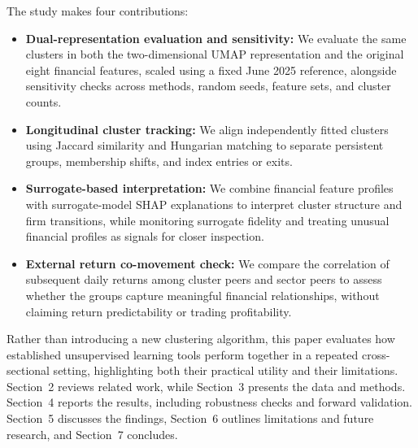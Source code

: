 The study makes four contributions:

\begin{itemize}
    \item \textbf{Dual-representation evaluation and sensitivity:} We evaluate the same clusters in both the two-dimensional UMAP representation and the original eight financial features, scaled using a fixed June 2025 reference, alongside sensitivity checks across methods, random seeds, feature sets, and cluster counts.
    \item \textbf{Longitudinal cluster tracking:} We align independently fitted clusters using Jaccard similarity and Hungarian matching to separate persistent groups, membership shifts, and index entries or exits.
    \item \textbf{Surrogate-based interpretation:} We combine financial feature profiles with surrogate-model SHAP explanations to interpret cluster structure and firm transitions, while monitoring surrogate fidelity and treating unusual financial profiles as signals for closer inspection.
    \item \textbf{External return co-movement check:} We compare the correlation of subsequent daily returns among cluster peers and sector peers to assess whether the groups capture meaningful financial relationships, without claiming return predictability or trading profitability.
\end{itemize}

Rather than introducing a new clustering algorithm, this paper evaluates how established unsupervised learning tools perform together in a repeated cross-sectional setting, highlighting both their practical utility and their limitations. Section~2 reviews related work, while Section~3 presents the data and methods. Section~4 reports the results, including robustness checks and forward validation. Section~5 discusses the findings, Section~6 outlines limitations and future research, and Section~7 concludes.
